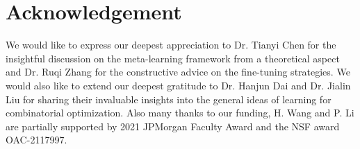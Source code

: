 \section{Acknowledgement}
We would like to express our deepest appreciation to Dr. Tianyi Chen for the insightful discussion on the meta-learning framework from a theoretical aspect and Dr. Ruqi Zhang for the constructive advice on the fine-tuning strategies. We would also like to extend our deepest gratitude to Dr. Hanjun Dai and Dr. Jialin Liu for sharing their invaluable insights into the general ideas of learning for combinatorial optimization. Also many thanks to our funding, H. Wang and P. Li are partially supported by 2021
JPMorgan Faculty Award and the NSF award OAC-2117997. 